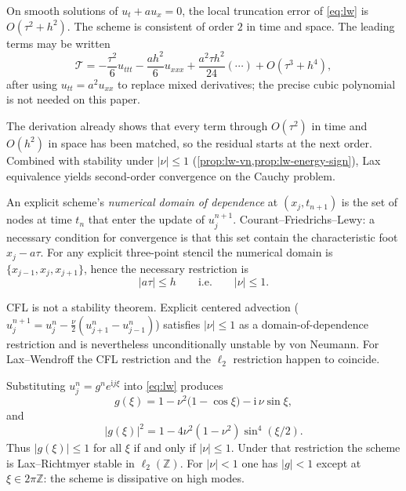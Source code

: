 \begin{proposition}
\label{prop:lw-trunc}
On smooth solutions of \(u_t+a u_x=0\), the local truncation error of \eqref{eq:lw} is \(O(\tau^2+h^2)\). The scheme is consistent of order \(2\) in time and space. The leading terms may be written
\[
\mathcal{T}
=
-\frac{\tau^2}{6}u_{ttt}
-
\frac{a h^2}{6}u_{xxx}
+
\frac{a^2\tau h^2}{24}(\cdots)
+
O(\tau^3+h^4),
\]
after using \(u_{tt}=a^2 u_{xx}\) to replace mixed derivatives; the precise cubic polynomial is not needed on this paper.
\end{proposition}

The derivation already shows that every term through \(O(\tau^2)\) in time and \(O(h^2)\) in space has been matched, so the residual starts at the next order. Combined with stability under \(\lvert\nu\rvert\le 1\) (\cref{prop:lw-vn,prop:lw-energy-sign}), Lax equivalence yields second-order convergence on the Cauchy problem.

\begin{definition}[CFL]
\label{def:cfl-p5}
An explicit scheme's \emph{numerical domain of dependence} at \((x_j,t_{n+1})\) is the set of nodes at time \(t_n\) that enter the update of \(u_j^{n+1}\). Courant--Friedrichs--Lewy: a necessary condition for convergence is that this set contain the characteristic foot \(x_j-a\tau\). For any explicit three-point stencil the numerical domain is \(\{x_{j-1},x_j,x_{j+1}\}\), hence the necessary restriction is
\[
\lvert a\tau\rvert
\le
h
\qquad\text{i.e.}\qquad
\lvert\nu\rvert\le 1.
\]
\end{definition}

CFL is not a stability theorem. Explicit centered advection (\(u_j^{n+1}=u_j^n-\frac{\nu}{2}(u_{j+1}^n-u_{j-1}^n)\)) satisfies \(\lvert\nu\rvert\le 1\) as a domain-of-dependence restriction and is nevertheless unconditionally unstable by von Neumann. For Lax--Wendroff the CFL restriction and the \(\ell_2\) restriction happen to coincide.

\begin{proposition}
\label{prop:lw-vn}
Substituting \(u_j^n=g^n e^{\mathrm{i} j\xi}\) into \eqref{eq:lw} produces
\[
g(\xi)
=
1-\nu^2\bigl(1-\cos\xi\bigr)
-
\mathrm{i}\,\nu\sin\xi,
\]
and
\begin{equation}
\label{eq:lw-gmod}
\lvert g(\xi)\rvert^2
=
1-4\nu^2(1-\nu^2)\sin^4(\xi/2).
\end{equation}
Thus \(\lvert g(\xi)\rvert\le 1\) for all \(\xi\) if and only if \(\lvert\nu\rvert\le 1\). Under that restriction the scheme is Lax--Richtmyer stable in \(\ell_2(\mathbb{Z})\). For \(\lvert\nu\rvert<1\) one has \(\lvert g\rvert<1\) except at \(\xi\in 2\pi\mathbb{Z}\): the scheme is dissipative on high modes.
\end{proposition}

